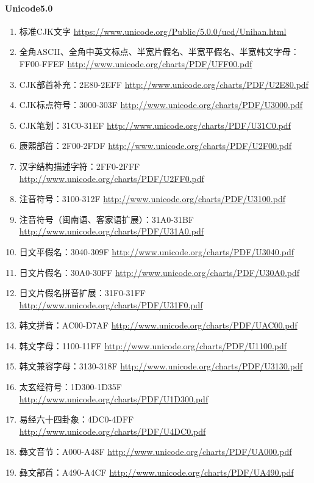 \paragraph{Unicode5.0}

\begin{enumerate}
  \item 标准CJK文字 \url{https://www.unicode.org/Public/5.0.0/ucd/Unihan.html}
  \item 全角ASCII、全角中英文标点、半宽片假名、半宽平假名、半宽韩文字母：FF00-FFEF \url{http://www.unicode.org/charts/PDF/UFF00.pdf}
  \item CJK部首补充：2E80-2EFF \url{http://www.unicode.org/charts/PDF/U2E80.pdf}
  \item CJK标点符号：3000-303F \url{http://www.unicode.org/charts/PDF/U3000.pdf}
  \item CJK笔划：31C0-31EF \url{http://www.unicode.org/charts/PDF/U31C0.pdf}
  \item 康熙部首：2F00-2FDF \url{http://www.unicode.org/charts/PDF/U2F00.pdf}
  \item 汉字结构描述字符：2FF0-2FFF \url{http://www.unicode.org/charts/PDF/U2FF0.pdf}
  \item 注音符号：3100-312F \url{http://www.unicode.org/charts/PDF/U3100.pdf}
  \item 注音符号（闽南语、客家语扩展）：31A0-31BF \url{http://www.unicode.org/charts/PDF/U31A0.pdf}
  \item 日文平假名：3040-309F \url{http://www.unicode.org/charts/PDF/U3040.pdf}
  \item 日文片假名：30A0-30FF \url{http://www.unicode.org/charts/PDF/U30A0.pdf}
  \item 日文片假名拼音扩展：31F0-31FF \url{http://www.unicode.org/charts/PDF/U31F0.pdf}
  \item 韩文拼音：AC00-D7AF \url{http://www.unicode.org/charts/PDF/UAC00.pdf}
  \item 韩文字母：1100-11FF \url{http://www.unicode.org/charts/PDF/U1100.pdf}
  \item 韩文兼容字母：3130-318F \url{http://www.unicode.org/charts/PDF/U3130.pdf}
  \item 太玄经符号：1D300-1D35F \url{http://www.unicode.org/charts/PDF/U1D300.pdf}
  \item 易经六十四卦象：4DC0-4DFF \url{http://www.unicode.org/charts/PDF/U4DC0.pdf}
  \item 彝文音节：A000-A48F \url{http://www.unicode.org/charts/PDF/UA000.pdf}
  \item 彝文部首：A490-A4CF \url{http://www.unicode.org/charts/PDF/UA490.pdf}

\end{enumerate}
